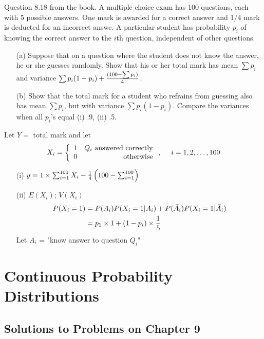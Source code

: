 \documentclass[english, 11pt]{article}
\begin{document}
  \begin{exmp}
    Question 8.18 from the book. A multiple choice exam has 100 questions, each with 5 possible answers. One mark is awarded for a correct answer and 1/4 mark is deducted for an incorrect answe. A particular student has probability $p_i$ of knowing the correct answer to the $i$th question, independent of other questions.
    \begin{itemize}
      \item[(a)] Suppose that on a question where the student does not know the answer, he or she guesses randomly. Show that his or her total mark has mean $\sum p_i$ and variance $\sum p_i(1-p_i) + \frac{(100 - \sum p_i)}{4}$.
      \item[(b)] Show that the total mark for a student who refrains from guessing also has mean $\sum p_i$, but with variance $\sum p_i(1-p_i)$. Compare the variances when all $p_i$'s equal (i) .9, (ii) .5.
    \end{itemize}

    Let $Y = $ total mark and let
   \[ X_i = \left\{ \begin{array}{lr} 1 & \mbox{$Q_i$ answered correctly} \\ 0 & \mbox{otherwise} \end{array} \right., \ \ \ \ i = 1,2,\ldots, 100 \]
   \begin{itemize}
     \item[(i)] $y = 1\times \sum_{i =1}^{100} X_i - \frac{1}{4} \left( 100 - \sum_{i =1}^{100} \right)$
     \item[(ii)] $E(X_i)$; $V(X_i)$
     \begin{align*}
       P(X_i = 1) & = P(A_i)P(X_i = 1|A_i) + P(\bar{A_i})P(X_i = 1|\bar{A_i}) \\
       & = p_1 \times 1 + (1-p_i) \times \frac{1}{5}
     \end{align*}
     Let $A_i$ = "know answer to question $Q_i$"
   \end{itemize}
  \end{exmp}


  \section{Continuous Probability Distributions}

  \subsection{Solutions to Problems on Chapter 9}
\end{document}

